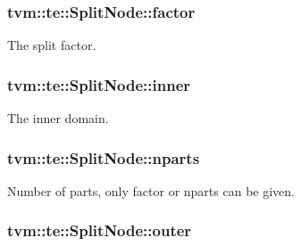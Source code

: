\subsubsection[{\texorpdfstring{factor}{factor}}]{ tvm\+::te\+::\+Split\+Node\+::factor}\hypertarget{classtvm_1_1te_1_1SplitNode_a60369ff01e34008f1b3215d7f215b972}{}\label{classtvm_1_1te_1_1SplitNode_a60369ff01e34008f1b3215d7f215b972}


The split factor. 

\subsubsection[{\texorpdfstring{inner}{inner}}]{ tvm\+::te\+::\+Split\+Node\+::inner}\hypertarget{classtvm_1_1te_1_1SplitNode_a54baaf3b5697606521b164b5db7bb8ba}{}\label{classtvm_1_1te_1_1SplitNode_a54baaf3b5697606521b164b5db7bb8ba}


The inner domain. 

\subsubsection[{\texorpdfstring{nparts}{nparts}}]{ tvm\+::te\+::\+Split\+Node\+::nparts}\hypertarget{classtvm_1_1te_1_1SplitNode_a4e809bca962d95b7fab6a98f1617a05c}{}\label{classtvm_1_1te_1_1SplitNode_a4e809bca962d95b7fab6a98f1617a05c}


Number of parts, only factor or nparts can be given. 

\subsubsection[{\texorpdfstring{outer}{outer}}]{ tvm\+::te\+::\+Split\+Node\+::outer}\hypertarget{classtvm_1_1te_1_1SplitNode_a8d0f3974bbd80f360c717278ec932fbd}{}\label{classtvm_1_1te_1_1SplitNode_a8d0f3974bbd80f360c717278ec932fbd}


